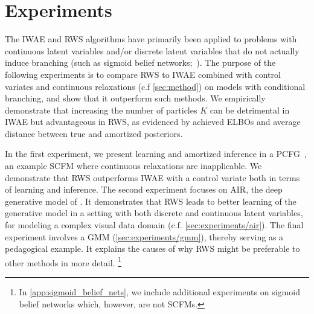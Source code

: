
\section{Experiments}
\label{sec:experiments}


The \gls{IWAE} and \gls{RWS} algorithms have primarily been applied to problems with continuous latent variables and/or discrete latent variables that do not actually induce branching (such as sigmoid belief networks;~\cite{neal1992connectionist}).
%
The purpose of the following experiments is to compare \gls{RWS} to \gls{IWAE} combined with control variates and continuous relaxations (c.f \cref{sec:method}) on models with conditional branching, and show that it outperform such methods.
%
We empirically demonstrate that increasing the number of particles $K$ can be detrimental in \gls{IWAE} but advantageous in \gls{RWS}, as evidenced by achieved \glspl{ELBO} and average distance between true and amortized posteriors.
%

In the first experiment, we present learning and amortized inference in a \gls{PCFG}~\citep{booth1973applying}, an example \gls{SCFM} where continuous relaxations are inapplicable.
We demonstrate that \gls{RWS} outperforms \gls{IWAE} with a control variate both in terms of learning and inference.
The second experiment focuses on \gls{AIR}, the deep generative model of \cite{eslami2016attend}.
It demonstrates that \gls{RWS} leads to better learning of the generative model in a setting with both discrete and continuous latent variables, for modeling a complex visual data domain (c.f. \cref{sec:experiments/air}).
The final experiment involves a \gls{GMM} (\cref{sec:experiments/gmm}), thereby serving as a pedagogical example.
It explains the causes of why \gls{RWS} might be preferable to other methods in more detail.
\footnote{In \cref{app:sigmoid_belief_nets}, we include additional experiments on sigmoid belief networks which, however, are not \glspl{SCFM}.}

